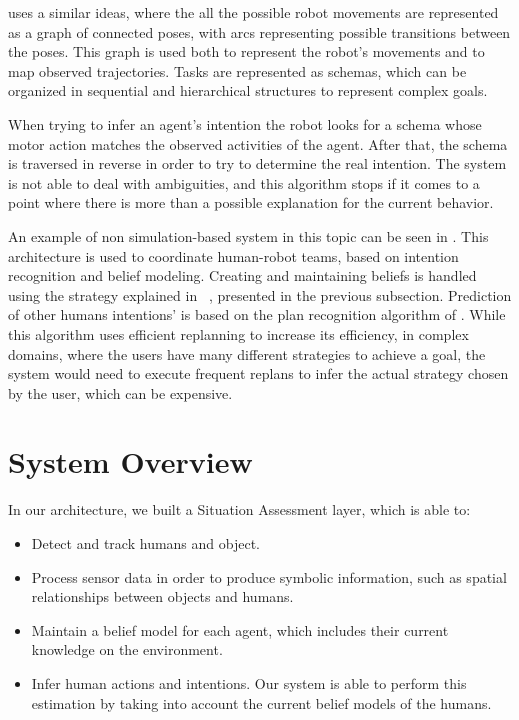 \cite{BreazealGB09} uses a similar ideas, where the all the possible robot movements are represented as a graph of connected poses, with arcs representing possible transitions between the poses. This graph is used both to represent the robot's movements and to map observed trajectories. Tasks are represented as schemas, which can be organized in sequential and hierarchical structures to represent complex goals.

 When trying to infer an agent's intention the robot looks for a schema whose motor action matches the observed activities of the agent. After that, the schema is traversed in reverse in order to try to determine the real intention. The system is not able to deal with ambiguities, and this algorithm stops if it comes to a point where there is more than a possible explanation for the current behavior. 

An example of non simulation-based system in this topic can be seen in \cite{talamadupula2014coordination}. This architecture is used to coordinate human-robot teams, based on intention recognition and belief modeling. Creating and maintaining beliefs is handled using the strategy explained in ~\cite{scheutz2013computational}, presented in the previous subsection. Prediction of other humans intentions' is based on the plan recognition algorithm of \cite{ramirez2009plan}. While this algorithm uses efficient replanning to increase its efficiency, in complex domains, where the users have many different strategies to achieve a goal, the system would need to execute frequent replans to infer the actual strategy chosen by the user, which can be expensive.

\section{System Overview}
\label{sec:situation_assessment-overview}

In our architecture, we built a Situation Assessment layer, which is able to:
\begin{itemize}
\item  Detect and track humans and object.
\item  Process sensor data in order to produce symbolic information, such as spatial relationships between objects and humans.
\item  Maintain a belief model for each agent, which includes their current knowledge on the environment.
\item  Infer human actions and intentions. Our system is able to perform this estimation by taking into account the current belief models of the humans. 
\end{itemize} 

